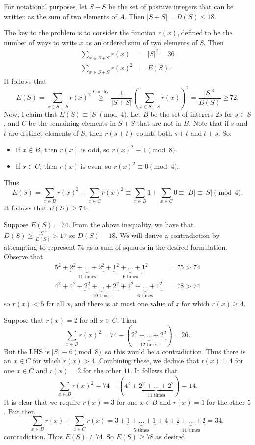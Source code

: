For notational purposes, let $S+S$ be the set of positive integers that can be written as the sum of two elements of $A$. Then $|S+S|=D(S)\leq18$.

The key to the problem is to consider the function $r(x)$, defined to be the number of ways to write $x$ as an ordered sum of two elements of $S$. Then
\begin{align*}
	\sum_{x\in S+S} r(x) &= |S|^2=36 \\
	\sum_{x\in S+S} r(x)^2 &= E(S).
\end{align*}
It follows that
\[
	E(S) = \sum_{x\in S+S} r(x)^2 \stackrel{\text{Cauchy}}{\geq} \frac{1}{|S+S|}\left(\sum_{x\in S+S} r(x)\right)^2=\frac{|S|^4}{D(S)}\geq72.
\]
Now, I claim that $E(S)\equiv|S|\pmod4$. Let $B$ be the set of integers $2s$ for $s\in S$, and $C$ be the remaining elements in $S+S$ that are not in $B$. Note that if $s$ and $t$ are distinct elements of $S$, then $r(s+t)$ counts both $s+t$ and $t+s$. So:
\begin{itemize}
	\item If $x\in B$, then $r(x)$ is odd, so $r(x)^2\equiv1\pmod8$.
	\item If $x\in C$, then $r(x)$ is even, so $r(x)^2\equiv0\pmod4$.
\end{itemize}
Thus
\[
	E(S) = \sum_{x\in B} r(x)^2 + \sum_{x\in C} r(x)^2 \equiv \sum_{x\in B} 1 + \sum_{x\in C} 0 \equiv |B| \equiv |S| \pmod4.
\]
It follows that $E(S)\geq74$.

Suppose $E(S)=74$. From the above inequality, we have that $D(S)\geq\frac{|S|^4}{E(S)}>17$ so $D(S)=18$. We will derive a contradiction by attempting to represent $74$ as a sum of squares in the desired formulation. Observe that
\begin{align*}
	5^2+\underbrace{2^2+\dots+2^2}_{\text{$11$ times}}+\underbrace{1^2+\dots+1^2}_{\text{$6$ times}} &= 75 > 74 \\
	4^2+4^2+\underbrace{2^2+\dots+2^2}_{\text{$10$ times}}+\underbrace{1^2+\dots+1^2}_{\text{$6$ times}} &= 78 > 74
\end{align*}
so $r(x)<5$ for all $x$, and there is at most one value of $x$ for which $r(x)\geq4$.

Suppose that $r(x)=2$ for all $x\in C$. Then
\[
	\sum_{x\in B} r(x)^2 = 74-(\underbrace{2^2+\dots+2^2}_{\text{$12$ times}})=26.
\]
But the LHS is $|S|\equiv6\pmod8$, so this would be a contradiction. Thus there is an $x\in C$ for which $r(x)>4$. Combining these, we deduce that $r(x)=4$ for one $x\in C$ and $r(x)=2$ for the other $11$. It follows that
\[
	\sum_{x\in B} r(x)^2 = 74-(4^2+\underbrace{2^2+\dots+2^2}_{\text{$11$ times}})=14.
\]
It is clear that we require $r(x)=3$ for one $x\in B$ and $r(x)=1$ for the other $5$. But then
\[
	\sum_{x\in B} r(x) + \sum_{x\in C} r(x) = 3+\underbrace{1+\dots+1}_{\text{$5$ times}}+4+\underbrace{2+\dots+2}_{\text{$11$ times}}=34,
\]
contradiction. Thus $E(S)\neq74$. So $E(S)\geq78$ as desired.

